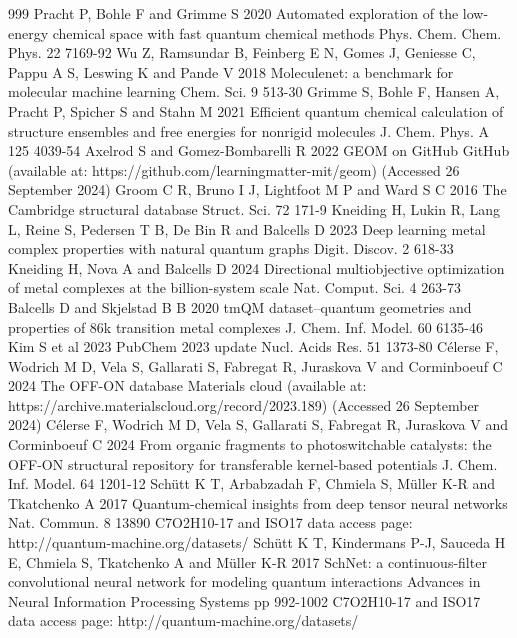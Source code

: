 \documentclass[12pt]{article}
\begin{document}
\begin{thebibliography}{999}
 Pracht P, Bohle F and Grimme S 2020 Automated exploration of the low-energy chemical space with fast quantum chemical methods Phys. Chem. Chem. Phys. 22 7169-92
 Wu Z, Ramsundar B, Feinberg E N, Gomes J, Geniesse C, Pappu A S, Leswing K and Pande V 2018 Moleculenet: a benchmark for molecular machine learning Chem. Sci. 9 513-30
 Grimme S, Bohle F, Hansen A, Pracht P, Spicher S and Stahn M 2021 Efficient quantum chemical calculation of structure ensembles and free energies for nonrigid molecules J. Chem. Phys. A 125 4039-54
 Axelrod S and Gomez-Bombarelli R 2022 GEOM on GitHub GitHub (available at: https://github.com/learningmatter-mit/geom) (Accessed 26 September 2024)
 Groom C R, Bruno I J, Lightfoot M P and Ward S C 2016 The Cambridge structural database Struct. Sci. 72 171-9
 Kneiding H, Lukin R, Lang L, Reine S, Pedersen T B, De Bin R and Balcells D 2023 Deep learning metal complex properties with natural quantum graphs Digit. Discov. 2 618-33
 Kneiding H, Nova A and Balcells D 2024 Directional multiobjective optimization of metal complexes at the billion-system scale Nat. Comput. Sci. 4 263-73
 Balcells D and Skjelstad B B 2020 tmQM dataset--quantum geometries and properties of 86k transition metal complexes J. Chem. Inf. Model. 60 6135-46
 Kim S et al 2023 PubChem 2023 update Nucl. Acids Res. 51 1373-80
 Célerse F, Wodrich M D, Vela S, Gallarati S, Fabregat R, Juraskova V and Corminboeuf C 2024 The OFF-ON database Materials cloud (available at: https://archive.materialscloud.org/record/2023.189) (Accessed 26 September 2024)
 Célerse F, Wodrich M D, Vela S, Gallarati S, Fabregat R, Juraskova V and Corminboeuf C 2024 From organic fragments to photoswitchable catalysts: the OFF-ON structural repository for transferable kernel-based potentials J. Chem. Inf. Model. 64 1201-12
 Schütt K T, Arbabzadah F, Chmiela S, Müller K-R and Tkatchenko A 2017 Quantum-chemical insights from deep tensor neural networks Nat. Commun. 8 13890
 C7O2H10-17 and ISO17 data access page: http://quantum-machine.org/datasets/
 Schütt K T, Kindermans P-J, Sauceda H E, Chmiela S, Tkatchenko A and Müller K-R 2017 SchNet: a continuous-filter convolutional neural network for modeling quantum interactions Advances in Neural Information Processing Systems pp 992-1002
 C7O2H10-17 and ISO17 data access page: http://quantum-machine.org/datasets/

\end{thebibliography}
\end{document}
